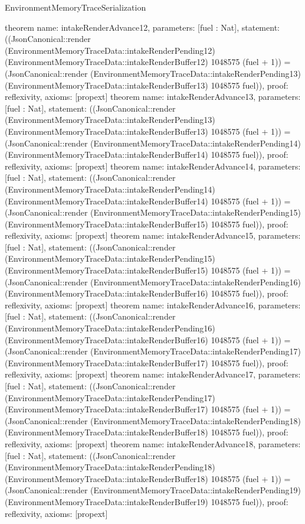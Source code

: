 \begin{lexlean}{EnvironmentMemoryTraceSerialization}
\begin{semanticmodule}
{}
theorem{
 name: intakeRenderAdvance12, parameters: [fuel : Nat],
 statement: ((JsonCanonical::render (EnvironmentMemoryTraceData::intakeRenderPending12) (EnvironmentMemoryTraceData::intakeRenderBuffer12) 1048575 (fuel + 1)) = (JsonCanonical::render (EnvironmentMemoryTraceData::intakeRenderPending13) (EnvironmentMemoryTraceData::intakeRenderBuffer13) 1048575 fuel)), proof: reflexivity{}, axioms: [propext]
}
theorem{
 name: intakeRenderAdvance13, parameters: [fuel : Nat],
 statement: ((JsonCanonical::render (EnvironmentMemoryTraceData::intakeRenderPending13) (EnvironmentMemoryTraceData::intakeRenderBuffer13) 1048575 (fuel + 1)) = (JsonCanonical::render (EnvironmentMemoryTraceData::intakeRenderPending14) (EnvironmentMemoryTraceData::intakeRenderBuffer14) 1048575 fuel)), proof: reflexivity{}, axioms: [propext]
}
theorem{
 name: intakeRenderAdvance14, parameters: [fuel : Nat],
 statement: ((JsonCanonical::render (EnvironmentMemoryTraceData::intakeRenderPending14) (EnvironmentMemoryTraceData::intakeRenderBuffer14) 1048575 (fuel + 1)) = (JsonCanonical::render (EnvironmentMemoryTraceData::intakeRenderPending15) (EnvironmentMemoryTraceData::intakeRenderBuffer15) 1048575 fuel)), proof: reflexivity{}, axioms: [propext]
}
theorem{
 name: intakeRenderAdvance15, parameters: [fuel : Nat],
 statement: ((JsonCanonical::render (EnvironmentMemoryTraceData::intakeRenderPending15) (EnvironmentMemoryTraceData::intakeRenderBuffer15) 1048575 (fuel + 1)) = (JsonCanonical::render (EnvironmentMemoryTraceData::intakeRenderPending16) (EnvironmentMemoryTraceData::intakeRenderBuffer16) 1048575 fuel)), proof: reflexivity{}, axioms: [propext]
}
theorem{
 name: intakeRenderAdvance16, parameters: [fuel : Nat],
 statement: ((JsonCanonical::render (EnvironmentMemoryTraceData::intakeRenderPending16) (EnvironmentMemoryTraceData::intakeRenderBuffer16) 1048575 (fuel + 1)) = (JsonCanonical::render (EnvironmentMemoryTraceData::intakeRenderPending17) (EnvironmentMemoryTraceData::intakeRenderBuffer17) 1048575 fuel)), proof: reflexivity{}, axioms: [propext]
}
theorem{
 name: intakeRenderAdvance17, parameters: [fuel : Nat],
 statement: ((JsonCanonical::render (EnvironmentMemoryTraceData::intakeRenderPending17) (EnvironmentMemoryTraceData::intakeRenderBuffer17) 1048575 (fuel + 1)) = (JsonCanonical::render (EnvironmentMemoryTraceData::intakeRenderPending18) (EnvironmentMemoryTraceData::intakeRenderBuffer18) 1048575 fuel)), proof: reflexivity{}, axioms: [propext]
}
theorem{
 name: intakeRenderAdvance18, parameters: [fuel : Nat],
 statement: ((JsonCanonical::render (EnvironmentMemoryTraceData::intakeRenderPending18) (EnvironmentMemoryTraceData::intakeRenderBuffer18) 1048575 (fuel + 1)) = (JsonCanonical::render (EnvironmentMemoryTraceData::intakeRenderPending19) (EnvironmentMemoryTraceData::intakeRenderBuffer19) 1048575 fuel)), proof: reflexivity{}, axioms: [propext]
}
\end{semanticmodule}
\end{lexlean}
